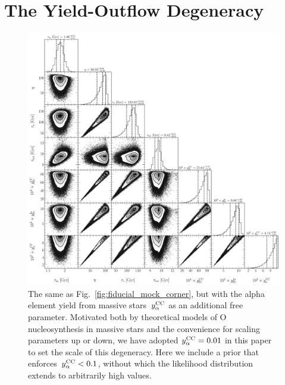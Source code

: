 \documentclass[foo.tex]{subfiles}
\begin{document}
\renewcommand\theequation{\thesection\arabic{equation}}
\renewcommand\thefigure{\thesection\arabic{figure}}
\setcounter{equation}{0}
\setcounter{figure}{0}

\section{The Yield-Outflow Degeneracy}
\label{sec:degeneracy}

\begin{figure}
\centering
\includegraphics[scale = 0.38]{degeneracy_512k.pdf}
\caption{
The same as Fig.~\ref{fig:fiducial_mock_corner}, but with the alpha element
yield from massive stars~$y_\alpha^\text{CC}$ as an additional free parameter.
Motivated both by theoretical models of O nucleosynthesis in massive stars and
the convenience for scaling parameters up or down, we have adopted
$y_\alpha^\text{CC} = 0.01$ in this paper to set the scale of this degeneracy.
Here we include a prior that enforces~$y_\alpha^\text{CC} < 0.1$, without which the
likelihood distribution extends to arbitrarily high values.
}
\label{fig:degeneracy}
\end{figure}
\end{document}
